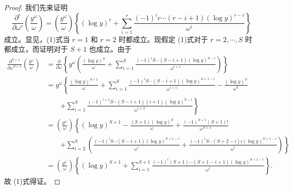 \begin{proof}
我们先来证明
\begin{equation}\label{eq:chen1}
\frac{\partial^r}{\partial\omega^r}\left(\frac{y^\omega}{\omega}\right)
=\left(\frac{y^\omega}{\omega}\right)\left\{(
\log y)^r+
\sum_{i=1}^{r}\frac{(-1)^i r\cdots(r-i+1)(\log y)^{r-i}}{\omega^i}\right\}
\end{equation}
成立。显见，(1)式当 $r=1$ 和 $r=2$ 时都成立。现假定 (1)式对于 $r=2,\cdots,S$ 时都成立，而证明对于 $S+1$ 也成立。由于
\begin{align*}
\frac{\partial^{S+1}}{\partial\omega^{S+1}}\left(\frac{y^\omega}{\omega}\right)
&=\frac{\partial}{\partial\omega}\left\{y^\omega\left(\frac{(\log y)^S}{\omega}
+\sum_{i=1}^{S}\frac{(-1)^i S\cdots(S-i+1)(\log y)^{S-i}}{\omega^{i+1}}\right)\right\}\\
&=y^\omega\left\{\frac{(\log y)^{S+1}}{\omega}
+\sum_{i=1}^{S}\frac{(-1)^i S\cdots(S-i+1)(\log y)^{S+1-i}}{\omega^{i+1}}
-\frac{(\log y)^S}{\omega^2}\right.\\
&\qquad\left.+\sum_{i=1}^{S}\frac{(-1)^{i+1}S\cdots(S-i+1)(i+1)(\log y)^{S-i}}{\omega^{i+2}}\right\}\\
&=\left(\frac{y^\omega}{\omega}\right)\left\{(
\log y)^{S+1}
-\frac{(S+1)(\log y)^S}{\omega}
+\frac{(-1)^{S+1}(S+1)!}{\omega^{S+1}}\right.\\
&\qquad\left.+\sum_{i=2}^{S}\left(
\frac{(-1)^i S\cdots(S-i+1)(\log y)^{S+1-i}}{\omega^i}
+\frac{(-1)^i S\cdots(S+2-i)i(\log y)^{S+1-i}}{\omega^i}
\right)\right\}\\
&=\left(\frac{y^\omega}{\omega}\right)\left\{(
\log y)^{S+1}
+\sum_{i=1}^{S+1}\frac{(-1)^i(S+1)\cdots(S+1-i+1)(\log y)^{S+1-i}}{\omega^i}\right\}.
\end{align*}
故 (1)式得证。


\end{proof}
